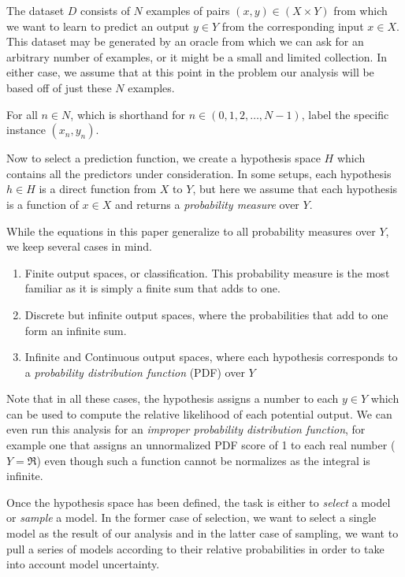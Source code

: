 \documentclass[twoside]{article}
\begin{document}
The dataset \(D\) consists of \(N\) examples of pairs \((x, y) \in (X \times Y) \) from which we want to learn to predict an output \(y \in Y\) from the corresponding input \(x \in X\). This dataset may be generated by an oracle from which we can ask for an arbitrary number of examples, or it might be a small and limited collection. In either case, we assume that at this point in the problem our analysis will be based off of just these \(N\) examples.

For all \(n \in N\), which is shorthand for \(n \in (0, 1, 2,\ldots,N-1)\), label the specific instance \((x_n, y_n)\).

Now to select a prediction function, we create a hypothesis space \(H\) which contains all the predictors under consideration. In some setups, each hypothesis \(h \in H\) is a direct function from \(X\) to \(Y\), but here we assume that each hypothesis is a function of \(x \in X\) and returns a \textit{probability measure} over \(Y\).

While the equations in this paper generalize to all probability measures over \(Y\), we keep several cases in mind.
\begin{enumerate}
	\item Finite output spaces, or classification. This probability measure is the most familiar as it is simply a finite sum that adds to one.
	\item Discrete but infinite output spaces, where the probabilities that add to one form an infinite sum.
	\item Infinite and Continuous output spaces, where each hypothesis corresponds to a \textit{probability distribution function} (PDF) over \(Y\)
\end{enumerate}

Note that in all these cases, the hypothesis assigns a number to each \(y \in Y\) which can be used to compute the relative likelihood of each potential output. We can even run this analysis for an \textit{improper probability distribution function}, for example one that assigns an unnormalized PDF score of 1 to each real number (\(Y=\Re\)) even though such a function cannot be normalizes as the integral is infinite.

Once the hypothesis space has been defined, the task is either to \textit{select} a model or \textit{sample} a model. In the former case of selection, we want to select a single model as the result of our analysis and in the latter case of sampling, we want to pull a series of models according to their relative probabilities in order to take into account model uncertainty.
\end{document}

